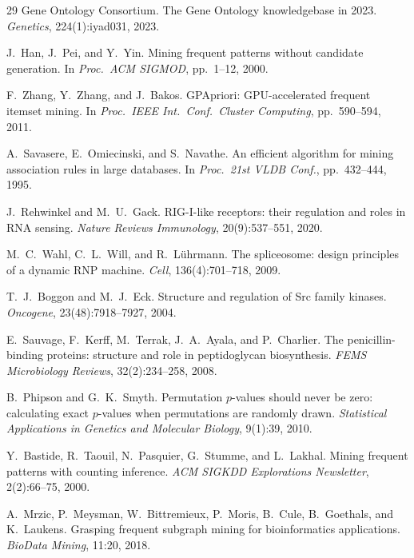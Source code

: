 \documentclass[10pt,a4paper,twocolumn]{article}
\begin{document}
\begin{thebibliography}{29}
Gene Ontology Consortium.
\newblock The Gene Ontology knowledgebase in 2023.
\newblock \emph{Genetics}, 224(1):iyad031, 2023.

J.~Han, J.~Pei, and Y.~Yin.
\newblock Mining frequent patterns without candidate generation.
\newblock In \emph{Proc.\ ACM SIGMOD}, pp.\ 1--12, 2000.

F.~Zhang, Y.~Zhang, and J.~Bakos.
\newblock GPApriori: GPU-accelerated frequent itemset mining.
\newblock In \emph{Proc.\ IEEE Int.\ Conf.\ Cluster Computing}, pp.\ 590--594, 2011.

A.~Savasere, E.~Omiecinski, and S.~Navathe.
\newblock An efficient algorithm for mining association rules in large databases.
\newblock In \emph{Proc.\ 21st VLDB Conf.}, pp.\ 432--444, 1995.

J.~Rehwinkel and M.~U.~Gack.
\newblock RIG-I-like receptors: their regulation and roles in RNA sensing.
\newblock \emph{Nature Reviews Immunology}, 20(9):537--551, 2020.

M.~C.~Wahl, C.~L.~Will, and R.~L\"uhrmann.
\newblock The spliceosome: design principles of a dynamic RNP machine.
\newblock \emph{Cell}, 136(4):701--718, 2009.

T.~J.~Boggon and M.~J.~Eck.
\newblock Structure and regulation of Src family kinases.
\newblock \emph{Oncogene}, 23(48):7918--7927, 2004.

E.~Sauvage, F.~Kerff, M.~Terrak, J.~A.~Ayala, and P.~Charlier.
\newblock The penicillin-binding proteins: structure and role in peptidoglycan biosynthesis.
\newblock \emph{FEMS Microbiology Reviews}, 32(2):234--258, 2008.

B.~Phipson and G.~K.~Smyth.
\newblock Permutation $p$-values should never be zero: calculating exact $p$-values when permutations are randomly drawn.
\newblock \emph{Statistical Applications in Genetics and Molecular Biology}, 9(1):39, 2010.

Y.~Bastide, R.~Taouil, N.~Pasquier, G.~Stumme, and L.~Lakhal.
\newblock Mining frequent patterns with counting inference.
\newblock \emph{ACM SIGKDD Explorations Newsletter}, 2(2):66--75, 2000.

A.~Mrzic, P.~Meysman, W.~Bittremieux, P.~Moris, B.~Cule, B.~Goethals, and K.~Laukens.
\newblock Grasping frequent subgraph mining for bioinformatics applications.
\newblock \emph{BioData Mining}, 11:20, 2018.


\end{thebibliography}
\end{document}
